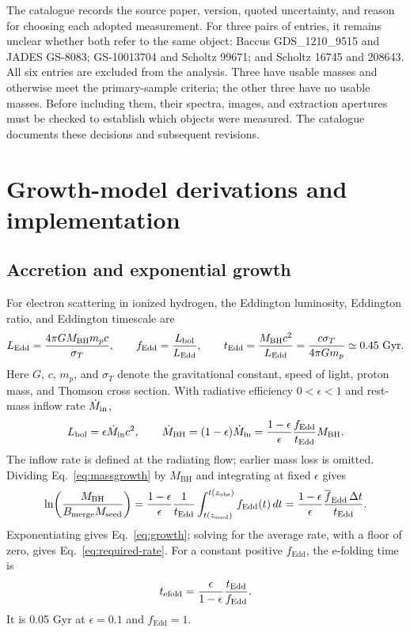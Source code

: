 \documentclass[11pt]{article}
\newcommand{\fedd}{f_{\mathrm{Edd}}}
\newcommand{\mbh}{M_{\mathrm{BH}}}
\newcommand{\mseed}{M_{\mathrm{seed}}}
\begin{document}
The catalogue records the source paper, version, quoted uncertainty, and
reason for choosing each adopted measurement. For three pairs of entries,
it remains unclear whether both refer to the same object: Baccus
GDS\_1210\_9515 and JADES GS-8083; GS-10013704 and Scholtz 99671;
and Scholtz 16745 and 208643. All six entries are excluded from the analysis.
Three have usable masses and otherwise meet the primary-sample criteria;
the other three have no usable masses. Before including them, their spectra,
images, and extraction apertures must be checked to establish which objects
were measured. The catalogue documents these decisions and subsequent revisions.

\section{Growth-model derivations and implementation}
\label{app:derivations}

\subsection{Accretion and exponential growth}

For electron scattering in ionized hydrogen, the Eddington luminosity,
Eddington ratio, and Eddington timescale are
\begin{equation}
L_{\rm Edd}=\frac{4\pi G\mbh m_p c}{\sigma_T},\qquad
\fedd=\frac{L_{\rm bol}}{L_{\rm Edd}},\qquad
t_{\rm Edd}=\frac{\mbh c^2}{L_{\rm Edd}}
=\frac{c\sigma_T}{4\pi Gm_p}\simeq0.45\ {\rm Gyr}.
\label{eq:eddington}
\end{equation}
Here $G$, $c$, $m_p$, and $\sigma_T$ denote the gravitational constant,
speed of light, proton mass, and Thomson cross section. With radiative
efficiency $0<\epsilon<1$ and rest-mass inflow rate $\dot M_{\rm in}$,
\begin{equation}
L_{\rm bol}=\epsilon\dot M_{\rm in}c^2,\qquad
\dot\mbh=(1-\epsilon)\dot M_{\rm in}
=\frac{1-\epsilon}{\epsilon}\frac{\fedd}{t_{\rm Edd}}\mbh.
\label{eq:massgrowth}
\end{equation}
The inflow rate is defined at the radiating flow; earlier mass loss is omitted.
Dividing Eq.~\ref{eq:massgrowth} by $\mbh$ and integrating at fixed
$\epsilon$ gives
\begin{equation}
\ln\!\left(\frac{\mbh}{B_{\rm merge}\mseed}\right)
=\frac{1-\epsilon}{\epsilon}\frac{1}{t_{\rm Edd}}
\int_{t(z_{\rm seed})}^{t(z_{\rm obs})}\fedd(t)\,dt
=\frac{1-\epsilon}{\epsilon}
\frac{\overline{f}_{\mathrm{Edd}}\,\Delta t}{t_{\rm Edd}}.
\end{equation}
Exponentiating gives Eq.~\ref{eq:growth}; solving for the average rate,
with a floor of zero, gives Eq.~\ref{eq:required-rate}.
For a constant positive $\fedd$, the e-folding time is
\begin{equation}
t_{\rm efold}=\frac{\epsilon}{1-\epsilon}\frac{t_{\rm Edd}}{\fedd}.
\end{equation}
It is 0.05 Gyr at $\epsilon=0.1$ and $\fedd=1$.
\end{document}
